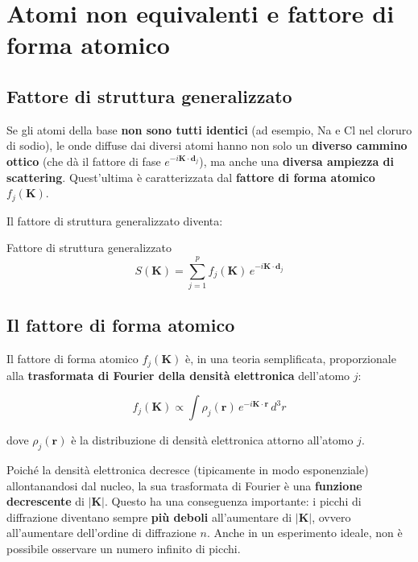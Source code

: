 \section{Atomi non equivalenti e fattore di forma atomico}

\subsection*{Fattore di struttura generalizzato}

Se gli atomi della base \textbf{non sono tutti identici} (ad esempio, Na e Cl nel cloruro di sodio), le onde diffuse dai diversi atomi hanno non solo un \textbf{diverso cammino ottico} (che dà il fattore di fase $e^{-i\mathbf{K}\cdot\mathbf{d}_j}$), ma anche una \textbf{diversa ampiezza di scattering}. Quest'ultima è caratterizzata dal \textbf{fattore di forma atomico} $f_j(\mathbf{K})$.

Il fattore di struttura generalizzato diventa:

\begin{equazione}{Fattore di struttura generalizzato}
\begin{equation}
S(\mathbf{K}) = \sum_{j=1}^{p} f_j(\mathbf{K})\, e^{-i\mathbf{K}\cdot\mathbf{d}_j}
\end{equation}
\end{equazione}

\subsection*{Il fattore di forma atomico}

Il fattore di forma atomico $f_j(\mathbf{K})$ è, in una teoria semplificata, proporzionale alla \textbf{trasformata di Fourier della densità elettronica} dell'atomo $j$:

$$f_j(\mathbf{K}) \propto \int \rho_j(\mathbf{r})\, e^{-i\mathbf{K}\cdot\mathbf{r}}\, d^3r$$

dove $\rho_j(\mathbf{r})$ è la distribuzione di densità elettronica attorno all'atomo $j$.

Poiché la densità elettronica decresce (tipicamente in modo esponenziale) allontanandosi dal nucleo, la sua trasformata di Fourier è una \textbf{funzione decrescente} di $|\mathbf{K}|$. Questo ha una conseguenza importante: i picchi di diffrazione diventano sempre \textbf{più deboli} all'aumentare di $|\mathbf{K}|$, ovvero all'aumentare dell'ordine di diffrazione $n$. Anche in un esperimento ideale, non è possibile osservare un numero infinito di picchi.

